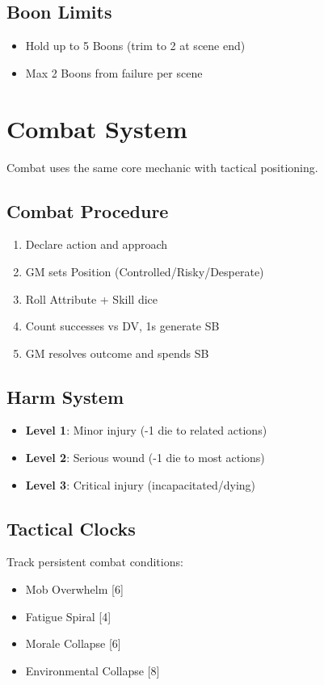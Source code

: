 \documentclass[11pt]{article}
\begin{document}
\subsection{Boon Limits}
\begin{itemize}
    \item Hold up to 5 Boons (trim to 2 at scene end)
    \item Max 2 Boons from failure per scene
\end{itemize}

\section{Combat System}

Combat uses the same core mechanic with tactical positioning.

\subsection{Combat Procedure}
\begin{enumerate}
    \item Declare action and approach
    \item GM sets Position (Controlled/Risky/Desperate)
    \item Roll Attribute + Skill dice
    \item Count successes vs DV, 1s generate SB
    \item GM resolves outcome and spends SB
\end{enumerate}

\subsection{Harm System}
\begin{itemize}
    \item \textbf{Level 1}: Minor injury (-1 die to related actions)
    \item \textbf{Level 2}: Serious wound (-1 die to most actions)
    \item \textbf{Level 3}: Critical injury (incapacitated/dying)
\end{itemize}

\subsection{Tactical Clocks}
Track persistent combat conditions:
\begin{itemize}
    \item Mob Overwhelm [6]
    \item Fatigue Spiral [4] 
    \item Morale Collapse [6]
    \item Environmental Collapse [8]
\end{itemize}
\end{document}
